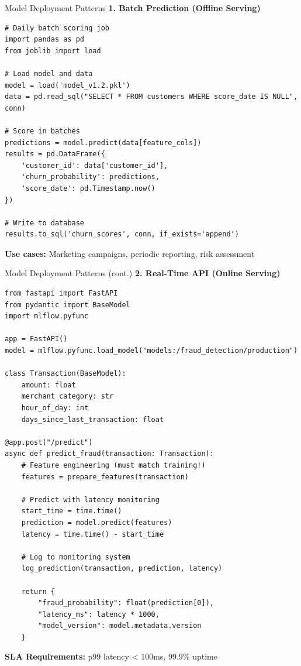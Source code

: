 \begin{frame}[fragile]{Model Deployment Patterns}
\textbf{1. Batch Prediction (Offline Serving)}
\begin{lstlisting}[basicstyle=\ttfamily\tiny]
# Daily batch scoring job
import pandas as pd
from joblib import load

# Load model and data
model = load('model_v1.2.pkl')
data = pd.read_sql("SELECT * FROM customers WHERE score_date IS NULL", conn)

# Score in batches
predictions = model.predict(data[feature_cols])
results = pd.DataFrame({
    'customer_id': data['customer_id'],
    'churn_probability': predictions,
    'score_date': pd.Timestamp.now()
})

# Write to database
results.to_sql('churn_scores', conn, if_exists='append')
\end{lstlisting}

\textbf{Use cases:} Marketing campaigns, periodic reporting, risk assessment
\end{frame}

\begin{frame}[fragile]{Model Deployment Patterns (cont.)}
\textbf{2. Real-Time API (Online Serving)}
\begin{lstlisting}[basicstyle=\ttfamily\tiny]
from fastapi import FastAPI
from pydantic import BaseModel
import mlflow.pyfunc

app = FastAPI()
model = mlflow.pyfunc.load_model("models:/fraud_detection/production")

class Transaction(BaseModel):
    amount: float
    merchant_category: str
    hour_of_day: int
    days_since_last_transaction: float

@app.post("/predict")
async def predict_fraud(transaction: Transaction):
    # Feature engineering (must match training!)
    features = prepare_features(transaction)

    # Predict with latency monitoring
    start_time = time.time()
    prediction = model.predict(features)
    latency = time.time() - start_time

    # Log to monitoring system
    log_prediction(transaction, prediction, latency)

    return {
        "fraud_probability": float(prediction[0]),
        "latency_ms": latency * 1000,
        "model_version": model.metadata.version
    }
\end{lstlisting}

\textbf{SLA Requirements:} p99 latency < 100ms, 99.9\% uptime
\end{frame}

